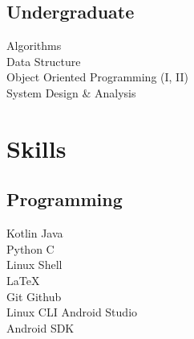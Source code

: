 \documentclass[]{deedy-resume-openfont}
\begin{document}
\begin{minipage}[t]{0.33\textwidth}
\subsection{Undergraduate}
Algorithms\\
Data Structure\\
Object Oriented Programming (I, II)\\
System Design \& Analysis



\section{Skills}
\subsection{Programming}
\textbullet{} Kotlin \textbullet{} Java \\
\textbullet{} Python \textbullet{} C \\
\textbullet{} Linux Shell \\
\textbullet{}\LaTeX\ \\ 
\textbullet{} Git \textbullet{} Github \\
\textbullet{} Linux CLI \textbullet{} Android Studio\\
\textbullet{} Android SDK
\sectionsep
%
%

\end{minipage} 
\hfill
\end{document}
